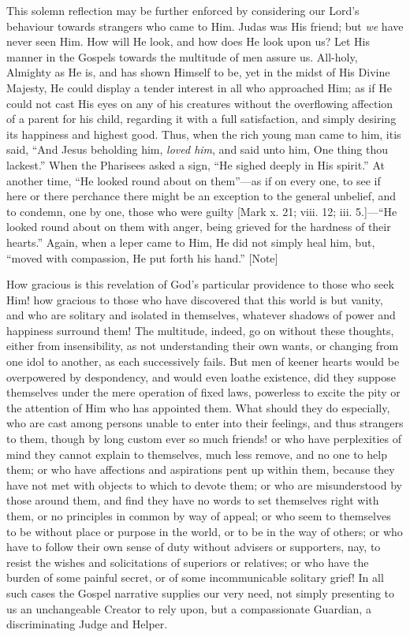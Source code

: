 This solemn reflection may be further enforced by considering our
Lord's behaviour towards strangers who came to Him. Judas was His
friend; but \emph{we} have never seen Him. How will He look, and how
does He look upon us? Let His manner in the Gospels towards the
multitude of men assure us. All-holy, Almighty as He is, and has shown
Himself to be, yet in the midst of His Divine Majesty, He could
display a tender interest in all who approached Him; as if He could
not cast His eyes on any of his creatures without the overflowing
affection of a parent for his child, regarding it with a full
satisfaction, and simply desiring its happiness and highest good.
Thus, when the rich young man came to him, it\emph{}is said,
``And Jesus beholding him, \emph{loved him}, and said unto him,
One thing thou lackest.'' When the Pharisees asked a sign,
``He sighed deeply in His spirit.'' At another time, ``He
looked round about on them''—as if on every one, to see if here
or there perchance there might be an exception to the general
unbelief, and to condemn, one by one, those who were guilty [Mark x.
21; viii. 12; iii. 5.]—``He looked round about on them with
anger, being grieved for the hardness of their hearts.'' Again,
when a leper came to Him, He did not simply heal him, but, ``moved
with compassion, He put forth his hand.'' [Note]

How gracious is this revelation of God's particular providence to
those who seek Him! how gracious to those who have discovered that
this world is but vanity, and who are solitary and isolated in
themselves, whatever shadows of power and happiness surround them! The
multitude, indeed, go on without these thoughts, either from
insensibility, as not understanding their own wants, or changing from
one idol to another, as each successively fails. But men of keener
hearts would be overpowered by despondency, and would even loathe
existence, did they suppose themselves under the mere operation of
fixed laws, powerless to excite the pity or the attention of Him who
has appointed them. What should they do especially, who are cast among
persons unable to enter into their feelings, and thus strangers to
them, though by long custom ever so much friends! or who have
perplexities of mind they cannot explain to themselves, much less
remove, and no one to help them; or who have affections and
aspirations pent up within them, because they have not met with
objects to which to devote them; or who are misunderstood by those
around them, and find they have no words to set themselves right with
them, or no principles in common by way of appeal; or who seem to
themselves to be without place or purpose in the world, or to be in
the way of others; or who have to follow their own sense of duty
without advisers or supporters, nay, to resist the wishes and
solicitations of superiors or relatives; or who have the burden of
some painful secret, or of some incommunicable solitary grief! In all
such cases the Gospel narrative supplies our very need, not simply
presenting to us an unchangeable Creator to rely upon, but a
compassionate Guardian, a discriminating Judge and Helper.

